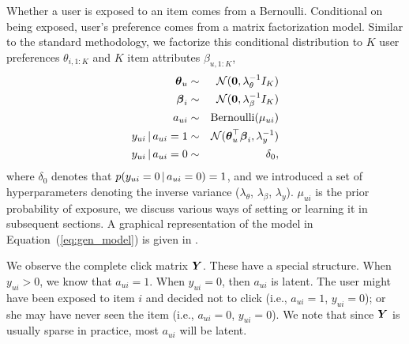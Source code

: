 Whether a user is exposed to an item comes from a Bernoulli. Conditional on being exposed, user's preference comes from a matrix factorization model. Similar to the standard methodology, we factorize this conditional distribution to $K$ user preferences $\theta_{i,1:K}$ and $K$ item attributes $\beta_{u,1:K}$,
\begin{eqnarray} %
	\boldsymbol\theta_{u} &\sim& \mathcal{N}(\bzero, \lambda_\theta^{-1} I_K) \nonumber \\
	\boldsymbol\beta_{i} &\sim& \mathcal{N}(\bzero, \lambda_\beta^{-1} I_K)  \nonumber \\
	a_{ui} &\sim& \mathrm{Bernoulli}(\mu_{ui}) \nonumber \\
	y_{ui} \g a_{ui} = 1 &\sim& \mathcal{N}(\boldsymbol\theta_u^\top \boldsymbol\beta_i, \lambda_y^{-1}) \nonumber \\
	y_{ui} \g a_{ui} = 0 &\sim& \delta_0,
	\label{eq:gen_model}
 \end{eqnarray}
where $\delta_0$ denotes that $p(y_{ui} = 0 \,\vert\, a_{ui} = 0) = 1$, and we
introduced a set of hyperparameters denoting the inverse variance
($\lambda_\theta$, $\lambda_\beta$, $\lambda_y$). $\mu_{ui}$ is the prior
probability of exposure, we discuss various ways of setting or learning it
in subsequent sections. 
A graphical representation of the model in Equation~(\ref{eq:gen_model}) is given in . 

We observe the complete click matrix $\boldsymbol{Y}$. These have a special structure. When $y_{ui} > 0$, we know that $a_{ui} = 1$. When $y_{ui} = 0$, then $a_{ui}$ is latent. 
The user might have been exposed to item $i$ and decided not to click (i.e., $a_{ui}=1$, $y_{ui} = 0$); 
or she may have never seen the item (i.e., $a_{ui}=0$, $y_{ui}=0$). 
We note that since $\boldsymbol{Y}$ is usually sparse in practice, 
most $a_{ui}$ will be latent.


